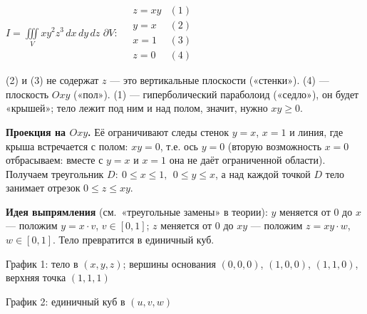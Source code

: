 

\begin{shapka}
$\displaystyle I=\iiint\limits_{V}xy^2z^3\,dx\,dy\,dz$
\tcblower
$\partial V:\quad
\begin{array}{ll}
z=xy & (1)\\
y=x & (2)\\
x=1 & (3)\\
z=0 & (4)
\end{array}$
\end{shapka}

(2) и (3) не содержат $z$ --- это вертикальные плоскости («стенки»). (4) --- плоскость $Oxy$ («пол»). (1) --- гиперболический параболоид («седло»), он будет «крышей»; тело лежит под ним и над полом, значит, нужно $xy\geqslant0$.

\textbf{Проекция на $Oxy$.} Её ограничивают следы стенок $y=x$, $x=1$ и линия, где крыша встречается с полом: $xy=0$, т.е. ось $y=0$ (вторую возможность $x=0$ отбрасываем: вместе с $y=x$ и $x=1$ она не даёт ограниченной области). Получаем треугольник
$D:\ 0\leqslant x\leqslant1,\ \ 0\leqslant y\leqslant x$, а над каждой точкой $D$ тело занимает отрезок $0\leqslant z\leqslant xy$.

\textbf{Идея выпрямления} (см.\ «треугольные замены» в теории): $y$ меняется от $0$ до $x$ --- положим $y=x\cdot v$, $v\in[0,1]$; $z$ меняется от $0$ до $xy$ --- положим $z=xy\cdot w$, $w\in[0,1]$. Тело превратится в единичный куб.

\begin{center}
\begin{minipage}[t]{0.49\linewidth}\centering
\figSix

\small График 1: тело в $(x,y,z)$; вершины основания $(0,0,0)$, $(1,0,0)$, $(1,1,0)$, верхняя точка $(1,1,1)$
\end{minipage}\hfill
\begin{minipage}[t]{0.49\linewidth}\centering
{}

\small График 2: единичный куб в $(u,v,w)$
\end{minipage}
\end{center}

